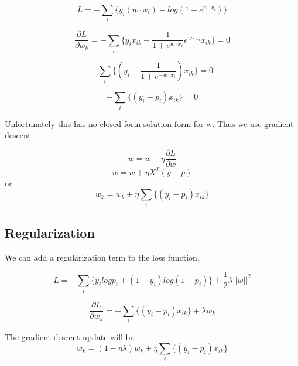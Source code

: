      \begin{equation}
     L=-\sum\limits_{i}\{
     y_{i}( w \cdot x_{i}) - log(1+e^{w \cdot x_{i}})
     \}
     \end{equation}
     
        
    \begin{equation}
    \frac{\partial L}{\partial w_{k}}=-\sum\limits_{i}\{
    y_{i}x_{ik} - \frac{1}{1+e^{w \cdot x_{i}}}e^{w \cdot x_{i}}x_{ik}
    \}=0
    \end{equation}
 
        \begin{equation}
        -\sum\limits_{i}\{(y_{i}-\frac{1}{1+e^{-w \cdot x_{i}}})x_{ik}\}=0
        \end{equation}
        
           
       \begin{equation}
       -\sum\limits_{i}\{(y_{i}-p_{i})x_{ik}\}=0
       \end{equation}
  
  Unfortunately this has no closed form solution form for w. Thus we use gradient descent.     
 
     \begin{equation}       
    w=w-\eta \frac{\partial L}{\partial w}
    \end{equation}
    \begin{equation}
     w=w + \eta X^{T}(y-p)
    \end{equation}
 or
     \begin{equation}
     w_{k}=w_{k} + \eta \sum\limits_{i}\{(y_{i}-p_{i})x_{ik}\}
     \end{equation}
 
 \subsection{Regularization}
 We can add a regularization term to the loss function.
 
     \begin{equation}
     L=-\sum\limits_{i}\{
     y_{i}logp_{i} +  (1-y_{i})log(1-p_{i})\} + \frac{1}{2}\lambda ||{w}||^{2}     
     \end{equation}
     
     \begin{equation}
     \frac{\partial L}{\partial w_{k}}=-\sum\limits_{i}\{(y_{i}-p_{i})x_{ik}\} + \lambda w_{k}
     \end{equation}
 
The gradient descent update will be
     \begin{equation}
     w_{k}=(1-\eta \lambda)w_{k} + \eta \sum\limits_{i}\{(y_{i}-p_{i})x_{ik}\}
     \end{equation}

